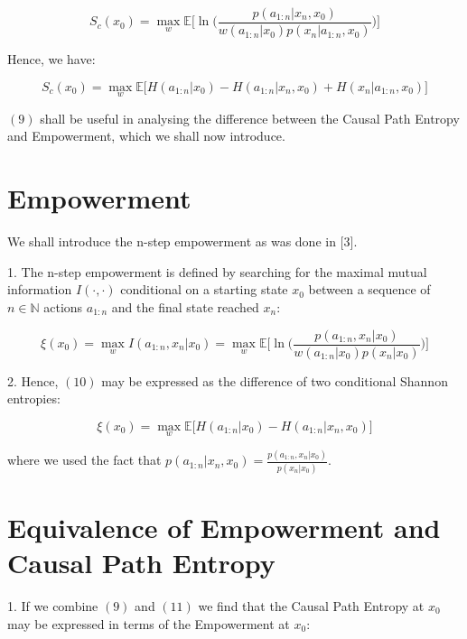 \documentclass{article}
\begin{document}
\begin{equation}
S_c(x_0) = \max\limits_{w} \mathbb{E} \big[ \ln \big( \frac{p(a_{1:n}|x_n,x_0)}{w(a_{1:n}|x_0)p(x_n|a_{1:n},x_0)}\big)\big]
\end{equation}

Hence, we have:

\begin{equation}
S_c(x_0) = \max\limits_{w} \mathbb{E} \big[H(a_{1:n}|x_0)-H(a_{1:n}|x_n,x_0) +H(x_n|a_{1:n},x_0)\big]
\end{equation}

$(9)$ shall be useful in analysing the difference between the Causal Path Entropy and Empowerment, which we shall now introduce.  



\section{Empowerment}

We shall introduce the n-step empowerment as was done in [3]. 

1. The n-step empowerment is defined by searching for the maximal mutual information $I(\cdot,\cdot)$ conditional on a starting state $x_0$ between a sequence of $n \in \mathbb{N}$ actions $a_{1:n}$ and the final state reached $x_n$:

\begin{equation}
\xi(x_0) = \max\limits_{w} I(a_{1:n},x_n|x_0)=\max\limits_{w} \mathbb{E}  \big[ \ln \big( \frac{p(a_{1:n},x_n|x_0)}{w(a_{1:n}|x_0)p(x_n|x_0)}\big)\big]
\end{equation}

2. Hence, $(10)$ may be expressed as the difference of two conditional Shannon entropies:

\begin{equation}
\xi(x_0) = \max\limits_{w}  \mathbb{E}  \big[H(a_{1:n}|x_0)-H(a_{1:n}|x_n,x_0) \big]
\end{equation}

where we used the fact that $p(a_{1:n}|x_n,x_0)=\frac{p(a_{1:n},x_n|x_0)}{p(x_n|x_0)}$.

\newpage

\section{Equivalence of Empowerment and Causal Path Entropy}

1. If we combine $(9)$ and $(11)$ we find that the Causal Path Entropy at $x_0$ may be expressed in terms of the Empowerment at $x_0$:
\end{document}
